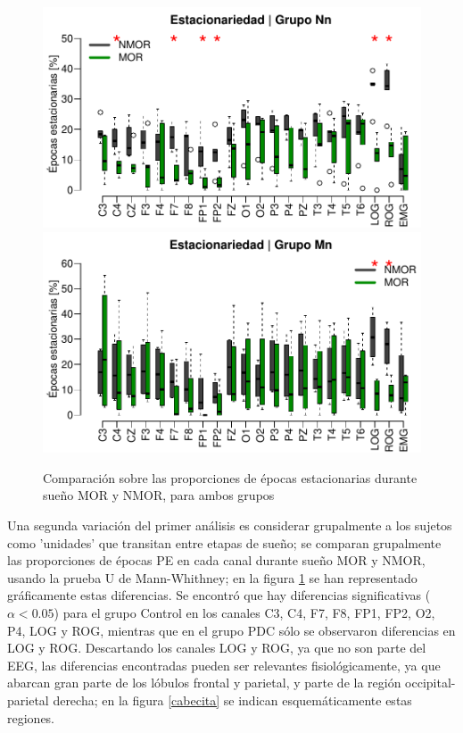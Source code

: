 \begin{figure}
\centering
\includegraphics[width=\linewidth]
{./img_ejemplos/Comparacion_etapas_normal_MOR_vs_NMOR_v2.pdf} \\
\includegraphics[width=0.95\linewidth]
{./img_ejemplos/Comparacion_etapas_pdc_MOR_vs_NMOR_v2.pdf} \\
\caption{Comparación sobre las proporciones de épocas estacionarias durante sueño MOR y NMOR, para 
ambos grupos}
\label{comparacion_verde}
\end{figure}

Una segunda variación del primer análisis es considerar grupalmente a los sujetos como 
'unidades' que transitan entre etapas de sueño; se comparan grupalmente las proporciones de 
épocas PE en cada canal durante sueño MOR y NMOR, usando la prueba U de Mann-Whithney; en 
la figura \ref{comparacion_verde} se han representado gráficamente estas diferencias.
Se encontró que hay diferencias significativas ($\alpha<0.05$) para el grupo Control en los 
canales C3, C4, F7, F8, FP1, FP2, O2, P4, LOG y ROG, mientras que en el grupo PDC sólo se
observaron diferencias en LOG y ROG.
Descartando los canales LOG y ROG, ya que no son parte del EEG, las diferencias encontradas pueden 
ser relevantes fisiológicamente, ya que abarcan gran parte de los lóbulos frontal y parietal, 
y parte de la región occipital-parietal derecha; en la figura \ref{cabecita} se indican 
esquemáticamente estas regiones.

